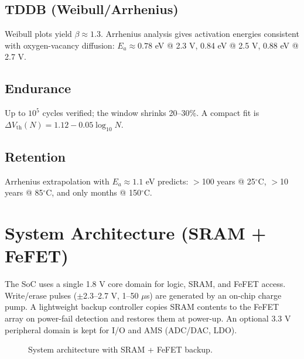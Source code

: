 \documentclass[conference]{IEEEtran}
\newcommand{\tightsecspace}{\vspace{0.3\baselineskip}}
\begin{document}
\subsection{TDDB (Weibull/Arrhenius)}
Weibull plots yield $\beta \approx 1.3$. 
Arrhenius analysis gives activation energies consistent with oxygen-vacancy diffusion: 
$E_a \approx 0.78$ eV @ 2.3 V, 0.84 eV @ 2.5 V, 0.88 eV @ 2.7 V.

\subsection{Endurance}
Up to $10^5$ cycles verified; the window shrinks 20–30\%. 
A compact fit is $\Delta V_{\mathrm{th}}(N) = 1.12 - 0.05 \log_{10} N$.

\subsection{Retention}
Arrhenius extrapolation with $E_a \approx 1.1$ eV predicts: $>$100 years @ 25$^\circ$C, $>$10 years @ 85$^\circ$C, and only months @ 150$^\circ$C.

\tightsecspace
\section{System Architecture (SRAM + FeFET)}
The SoC uses a single 1.8 V core domain for logic, SRAM, and FeFET access.
Write/erase pulses ($\pm$2.3–2.7 V, 1–50 $\mu$s) are generated by an on-chip charge pump.
A lightweight backup controller copies SRAM contents to the FeFET array on power-fail detection and restores them at power-up.
An optional 3.3 V peripheral domain is kept for I/O and AMS (ADC/DAC, LDO).

\begin{figure}[!t]
  \centering
  \caption{System architecture with SRAM + FeFET backup.}
  \label{fig:system}
\end{figure}
\end{document}
